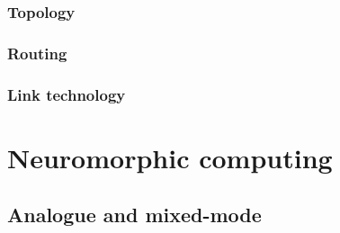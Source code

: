 			
			\subsubsection{Topology}
				
			
			\subsubsection{Routing}
				
			
			\subsubsection{Link technology}
				
	
	
	\section{Neuromorphic computing}
		
		
		\subsection{Analogue and mixed-mode}
			
			
